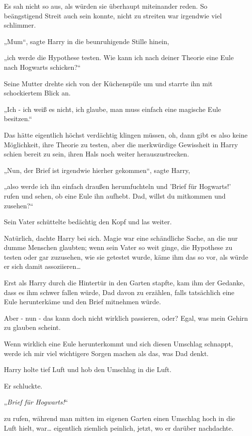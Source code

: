 {Es sah nicht so aus, als würden sie überhaupt miteinander reden. So beängstigend Streit auch sein konnte, nicht zu streiten war irgendwie viel schlimmer.

„Mum“, sagte Harry in die beunruhigende Stille hinein,

„ich werde die Hypothese testen. Wie kann ich nach deiner Theorie eine Eule nach Hogwarts schicken?“

Seine Mutter drehte sich von der Küchenspüle um und starrte ihn mit schockiertem Blick an.

„Ich - ich weiß es nicht, ich glaube, man muss einfach eine magische Eule besitzen.“

Das hätte eigentlich höchst verdächtig klingen müssen, oh, dann gibt es also keine Möglichkeit, ihre Theorie zu testen, aber die merkwürdige Gewissheit in Harry schien bereit zu sein, ihren Hals noch weiter herauszustrecken.

„Nun, der Brief ist irgendwie hierher gekommen“, sagte Harry,

„also werde ich ihn einfach draußen herumfuchteln und 'Brief für Hogwarts!' rufen und sehen, ob eine Eule ihn aufhebt. Dad, willst du mitkommen und zusehen?“

Sein Vater schüttelte bedächtig den Kopf und las weiter.

Natürlich, dachte Harry bei sich. Magie war eine schändliche Sache, an die nur dumme Menschen glaubten; wenn sein Vater so weit ginge, die Hypothese zu testen oder gar zuzusehen, wie sie getestet wurde, käme ihm das so vor, als würde er sich damit assoziieren…

Erst als Harry durch die Hintertür in den Garten stapfte, kam ihm der Gedanke, dass es ihm schwer fallen würde, Dad davon zu erzählen, falls tatsächlich eine Eule herunterkäme und den Brief mitnehmen würde.

Aber - nun - das kann doch nicht wirklich passieren, oder? Egal, was mein Gehirn zu glauben scheint.

Wenn wirklich eine Eule herunterkommt und sich diesen Umschlag schnappt, werde ich mir viel wichtigere Sorgen machen als das, was Dad denkt.

Harry holte tief Luft und hob den Umschlag in die Luft.

Er schluckte.

„\emph{Brief für Hogwarts!}“

zu rufen, während man mitten im eigenen Garten einen Umschlag hoch in die Luft hielt, war… eigentlich ziemlich peinlich, jetzt, wo er darüber nachdachte.

}
